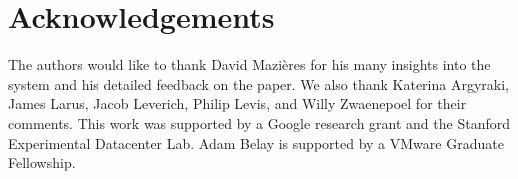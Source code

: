 
\section*{Acknowledgements}

The authors would like to thank David Mazi{\`e}res for his many
insights into the system and his detailed feedback on the
paper. We also thank Katerina Argyraki, James Larus, Jacob Leverich, Philip Levis, and Willy
Zwaenepoel for their comments. This work was supported by a Google
research grant and the Stanford Experimental Datacenter Lab. Adam Belay is supported
by a VMware Graduate Fellowship.  

\begin{comment}
\begin{itemize}
\item David Mazieres
\item Carlos Perez (EPFL) last minute IT setup
\item Detailed comments: Jacob Leverich, Jim Larus
\item High-level comments: Katerina Argyraki, Willy Z, Phil Levis
\item Sheperd
\item VMware Graduate Fellowship (for Adam)
\end{itemize}
\end{comment}



